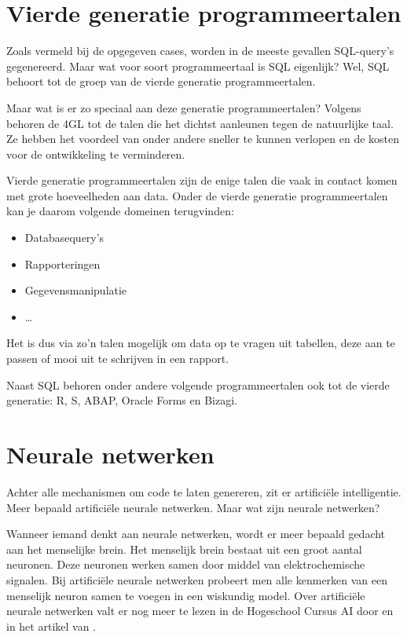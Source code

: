 \section{Vierde generatie programmeertalen}

Zoals vermeld bij de opgegeven cases, worden in de meeste gevallen SQL-query’s gegenereerd. Maar wat voor soort programmeertaal is SQL eigenlijk? Wel, SQL behoort tot de groep van de vierde generatie programmeertalen. 

Maar wat is er zo speciaal aan deze generatie programmeertalen? Volgens \textcite{fourthgenpl} behoren de 4GL tot de talen die het dichtst aanleunen tegen de natuurlijke taal. Ze hebben het voordeel van onder andere sneller te kunnen verlopen en de kosten voor de ontwikkeling te verminderen.

Vierde generatie programmeertalen zijn de enige talen die vaak in contact komen met grote hoeveelheden aan data. Onder de vierde generatie programmeertalen kan je daarom volgende domeinen terugvinden:

\begin{itemize}
	\item Databasequery’s
	\item Rapporteringen
	\item Gegevensmanipulatie
	\item \dots
\end{itemize}

Het is dus via zo’n talen mogelijk om data op te vragen uit tabellen, deze aan te passen of mooi uit te schrijven in een rapport.

Naast SQL behoren onder andere volgende programmeertalen ook tot de vierde generatie: R, S, ABAP, Oracle Forms en Bizagi.

\section{Neurale netwerken}

Achter alle mechanismen om code te laten genereren, zit er artificiële intelligentie. Meer bepaald artificiële neurale netwerken. Maar wat zijn neurale netwerken? 

Wanneer iemand denkt aan neurale netwerken, wordt er meer bepaald gedacht aan het menselijke brein. Het menselijk brein bestaat uit een groot aantal neuronen. Deze neuronen werken samen door middel van elektrochemische signalen. Bij artificiële neurale netwerken probeert men alle kenmerken van een menselijk neuron samen te voegen in een wiskundig model. Over artificiële neurale netwerken valt er nog meer te lezen in de Hogeschool Cursus AI door \textcite{cursusAI} en in het artikel van \textcite{techpulse}.

